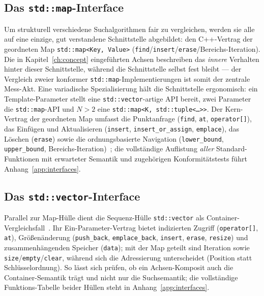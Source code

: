 \subsection{Das \texttt{std::map}-Interface}\label{sec:stdmap-interface}
Um strukturell verschiedene Suchalgorithmen fair zu vergleichen, werden sie alle auf eine einzige,
gut verstandene Schnittstelle abgebildet: den C++-Vertrag der geordneten Map
\texttt{std::map<Key,\,Value>} (\texttt{find}/\texttt{insert}/\texttt{erase}/Bereichs-Iteration).
Die in Kapitel~\ref{ch:concept} eingeführten Achsen beschreiben das \emph{innere} Verhalten hinter
dieser Schnittstelle, während die Schnittstelle selbst fest bleibt --- der Vergleich zweier
konformer \texttt{std::map}-Implementierungen ist somit der zentrale Mess-Akt. Eine variadische
Spezialisierung hält die Schnittstelle ergonomisch: ein Template-Parameter stellt eine
\texttt{std::vector}-artige API bereit, zwei Parameter die \texttt{std::map}-API und $N>2$ eine
\texttt{std::map<K,\,std::tuple<\ldots>>}. Der Kern-Vertrag der geordneten Map umfasst die
Punktanfrage (\texttt{find}, \texttt{at}, \texttt{operator[]}), das Einfügen und Aktualisieren
(\texttt{insert}, \texttt{insert\_or\_assign}, \texttt{emplace}), das Löschen (\texttt{erase}) sowie
die ordnungsbasierte Navigation (\texttt{lower\_bound}, \texttt{upper\_bound},
Bereichs-Iteration)~\cite{iso_cpp}; die vollständige Auflistung \emph{aller} Standard-Funktionen mit
erwarteter Semantik und zugehörigen Konformitätstests führt Anhang~\ref{app:interfaces}.

\subsection{Das \texttt{std::vector}-Interface}\label{ssec:stdvector-interface}
Parallel zur Map-Hülle dient die Sequenz-Hülle \texttt{std::vector} als
Container-Vergleichsfall~\cite{iso_cpp}. Ihr Ein-Parameter-Vertrag bietet indizierten Zugriff
(\texttt{operator[]}, \texttt{at}), Größenänderung (\texttt{push\_back}, \texttt{emplace\_back},
\texttt{insert}, \texttt{erase}, \texttt{resize}) und zusammenhängenden Speicher (\texttt{data});
mit der Map geteilt sind Iteration sowie \texttt{size}/\texttt{empty}/\texttt{clear}, während sich
die Adressierung unterscheidet (Position statt Schlüsselordnung). So lässt sich prüfen, ob ein
Achsen-Komposit auch die Container-Semantik trägt und nicht nur die Suchsemantik; die vollständige
Funktions-Tabelle beider Hüllen steht in Anhang~\ref{app:interfaces}.

